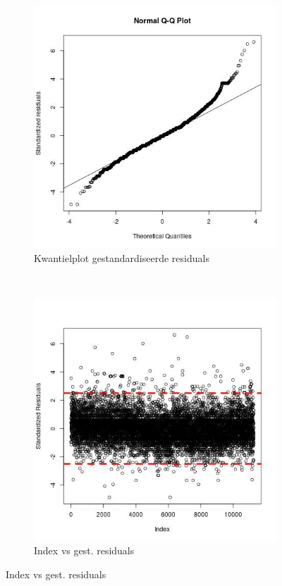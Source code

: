 \documentclass[a4paper,kulak]{kulakarticle} %
\begin{document}
\begin{figure}[H]
	\centering
	\begin{subfigure}[b]{0.45\textwidth}
		\includegraphics[width=\textwidth]{pcqq.jpeg}
		\caption{Kwantielplot gestandardiseerde residuals}
		\label{fig:pcqq}
	\end{subfigure}
	~ %
	\begin{subfigure}[b]{0.45\textwidth}
		\includegraphics[width=\textwidth]{pcisr.jpeg}
		\caption{Index vs gest. residuals}
		\label{fig:pcisr}
	\end{subfigure}
\end{figure}
\end{document}
